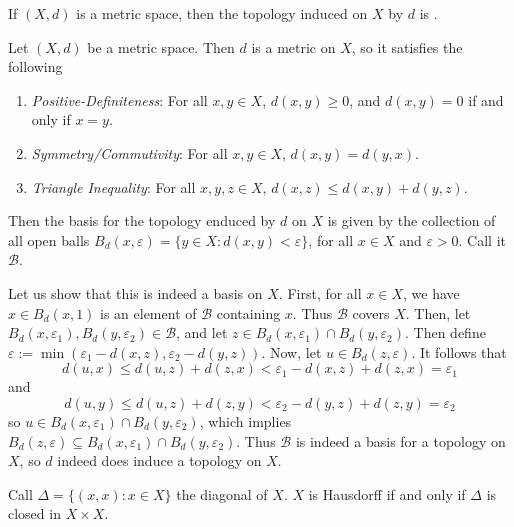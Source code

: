 \documentclass[12pt, a4paper, twoside, openright, titlepage]{book}
\begin{document}
\begin{xca*}{}{}
    If $(X,d)$ is a metric space, then the topology induced on $X$ by $d$ is . 
\end{xca*}
\begin{proof*}{}{}
    Let $(X,d)$ be a metric space. Then $d$ is a metric on $X$, so it satisfies the following \begin{enumerate}
        \item \emph{Positive-Definiteness}: For all $x,y \in X$, $d(x,y) \geq 0$, and $d(x,y) = 0$ if and only if $x = y$.
        \item \emph{Symmetry/Commutivity}: For all $x,y \in X$, $d(x,y) = d(y,x)$.
        \item \emph{Triangle Inequality}: For all $x,y,z \in X$, $d(x,z) \leq d(x,y) + d(y,z)$.
    \end{enumerate}
    Then the basis for the topology enduced by $d$ on $X$ is given by the collection of all open balls $B_d(x,\varepsilon) = \{y \in X: d(x,y) < \varepsilon\}$, for all $x \in X$ and $\varepsilon > 0$. Call it $\mathcal{B}$.

    Let us show that this is indeed a basis on $X$. First, for all $x \in X$, we have $x \in B_d(x,1)$ is an element of $\mathcal{B}$ containing $x$. Thus $\mathcal{B}$ covers $X$. Then, let $B_d(x,\varepsilon_1),B_d(y,\varepsilon_2) \in \mathcal{B}$, and let $z \in B_d(x,\varepsilon_1)\cap B_d(y,\varepsilon_2)$. Then define $\varepsilon := \min(\varepsilon_1 - d(x,z), \varepsilon_2 -d(y,z))$. Now, let $u \in B_d(z,\varepsilon)$. It follows that \begin{equation*}
        d(u,x) \leq d(u,z) + d(z,x) < \varepsilon_1 - d(x,z) + d(z,x) = \varepsilon_1
    \end{equation*}
    and \begin{equation*}
        d(u,y) \leq d(u,z) + d(z,y) < \varepsilon_2 - d(y,z) + d(z,y) = \varepsilon_2
    \end{equation*}
    so $u \in B_d(x,\varepsilon_1)\cap B_d(y,\varepsilon_2)$, which implies $B_d(z,\varepsilon) \subseteq B_d(x,\varepsilon_1)\cap B_d(y,\varepsilon_2)$. Thus $\mathcal{B}$ is indeed a basis for a topology on $X$, so $d$ indeed does induce a topology on $X$.
\end{proof*}

\begin{xca*}{}{}
    Call $\Delta = \{(x,x): x \in X\}$ the diagonal of $X$. $X$ is Hausdorff if and only if $\Delta$ is closed in $X \times X$.
\end{xca*}
\end{document}
